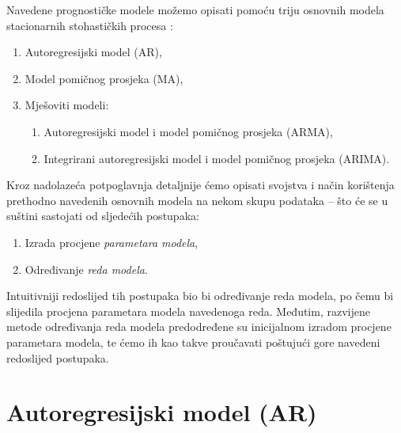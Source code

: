 \documentclass[a4paper,12pt,oneside]{memoir}
\begin{document}
        Navedene prognostičke modele možemo opisati pomoću triju osnovnih modela stacionarnih stohastičkih procesa \cite{Broersen}:
        
        \begin{enumerate}
            \item Autoregresijski model (AR),
            \item Model pomičnog prosjeka (MA),
            \item Mješoviti modeli:
            \begin{enumerate}
                \item Autoregresijski model i model pomičnog prosjeka (ARMA),
                \item Integrirani autoregresijski model i model pomičnog prosjeka (ARIMA).
            \end{enumerate}
        \end{enumerate}
        
        Kroz nadolazeća potpoglavnja detaljnije ćemo opisati svojstva i način korištenja prethodno navedenih osnovnih modela na nekom skupu podataka -- što će se u suštini sastojati od sljedećih postupaka:
        
        \begin{enumerate}
            \item Izrada procjene \textit{parametara modela},
            \item Određivanje \textit{reda modela}.
        \end{enumerate}

        Intuitivniji redoslijed tih postupaka bio bi određivanje reda modela, po čemu bi slijedila procjena parametara modela navedenoga reda. Međutim, razvijene metode određivanja reda modela predodređene su inicijalnom izradom procjene parametara modela, te ćemo ih kao takve proučavati poštujući gore navedeni redoslijed postupaka. \cite{Priestley}

        \section{Autoregresijski model (AR)}
\end{document}
